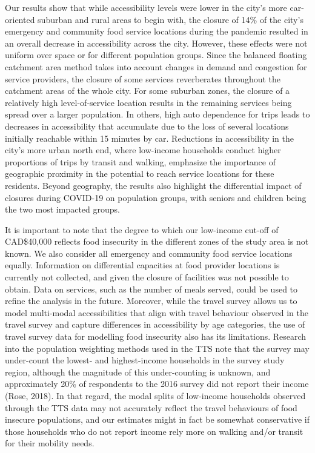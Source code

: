 \documentclass[]{elsarticle} %
\begin{document}
Our results show that while accessibility levels were lower in the
city's more car-oriented suburban and rural areas to begin with, the
closure of 14\% of the city's emergency and community food service
locations during the pandemic resulted in an overall decrease in
accessibility across the city. However, these effects were not uniform
over space or for different population groups. Since the balanced
floating catchment area method takes into account changes in demand and
congestion for service providers, the closure of some services
reverberates throughout the catchment areas of the whole city. For some
suburban zones, the closure of a relatively high level-of-service
location results in the remaining services being spread over a larger
population. In others, high auto dependence for trips leads to decreases
in accessibility that accumulate due to the loss of several locations
initially reachable within 15 minutes by car. Reductions in
accessibility in the city's more urban north end, where low-income
households conduct higher proportions of trips by transit and walking,
emphasize the importance of geographic proximity in the potential to
reach service locations for these residents. Beyond geography, the
results also highlight the differential impact of closures during
COVID-19 on population groups, with seniors and children being the two
most impacted groups.

It is important to note that the degree to which our low-income cut-off
of CAD\$40,000 reflects food insecurity in the different zones of the
study area is not known. We also consider all emergency and community
food service locations equally. Information on differential capacities
at food provider locations is currently not collected, and given the
closure of facilities was not possible to obtain. Data on services, such
as the number of meals served, could be used to refine the analysis in
the future. Moreover, while the travel survey allows us to model
multi-modal accessibilities that align with travel behaviour observed in
the travel survey and capture differences in accessibility by age
categories, the use of travel survey data for modelling food insecurity
also has its limitations. Research into the population weighting methods
used in the TTS note that the survey may under-count the lowest- and
highest-income households in the survey study region, although the
magnitude of this under-counting is unknown, and approximately 20\% of
respondents to the 2016 survey did not report their income (Rose, 2018).
In that regard, the modal splits of low-income households observed
through the TTS data may not accurately reflect the travel behaviours of
food insecure populations, and our estimates might in fact be somewhat
conservative if those households who do not report income rely more on
walking and/or transit for their mobility needs.
\end{document}
